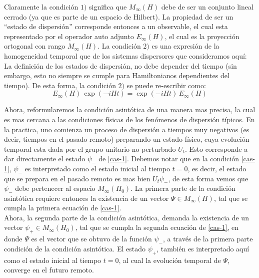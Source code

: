 \documentclass[12pt]{book}
\numberwithin{equation}{chapter}
\begin{document}
Claramente la condici\'on $1)$ significa que $M_{\infty}(H)$ debe de ser un conjunto lineal cerrado (ya que es parte de un espacio de Hilbert). La propiedad de ser un ``estado de dispersi\'on'' corresponde entonces a un observable, el cual esta representado por el operador auto adjunto $E_{\infty}(H)$, el cual es la proyecci\'on ortogonal con rango $M_{\infty}(H)$. La condici\'on $2)$ es una expresi\'on de la homogeneidad temporal que de los sistemas dispersores que consideramos aqu\'i: La definici\'on de los estados de dispersi\'on, no debe depender del tiempo (sin embargo, esto no siempre se cumple para Hamiltonianos dependientes del tiempo). De esta forma, la condici\'on $2)$ se puede re-escribir como:
\begin{equation}
E_{\infty}(H) \, \exp (-iHt) = \exp (-iHt) \, E_{\infty}(H)
\end{equation}

Ahora, reformularemos la condici\'on asint\'otica de una manera mas precisa, la cual es mas cercana a las condiciones f\'isicas de los fen\'omenos de dispersi\'on t\'ipicos. En la practica, uno comienza un proceso de dispersi\'on a tiempos muy negativos (es decir, tiempos en el pasado remoto) preparando un estado f\'isico, cuya evoluci\'on temporal esta dada por el grupo unitario no perturbado $U_{t}$. Esto corresponde a dar directamente el estado $\psi_{-}$ de \eqref{cas-1}. Debemos notar que en la condici\'on \eqref{cas-1}, $\psi_{-}$ es interpretado como el estado inicial al tiempo $t=0$, es decir, el estado que se prepara en el pasado remoto es mas bien $U_{t}\psi_{-}$, de esta forma vemos que $\psi_{-}$ debe pertenecer al espacio $M_{\infty} (H_{0})$. La primera parte de la condici\'on asint\'otica requiere entonces la existencia de un vector $\Psi \in M_{\infty} (H)$, tal que se cumpla la primera ecuaci\'on de \eqref{cas-1}.\\
Ahora, la segunda parte de la condici\'on asint\'otica, demanda la existencia de un vector $\psi_{+} \in M_{\infty}(H_{0})$, tal que se cumpla la segunda ecuaci\'on de \eqref{cas-1}, en donde $\Psi$ es el vector que se obtuvo de la funci\'on $\psi_{-}$, a trav\'es de la primera parte condici\'on de la condici\'on asint\'otica. El estado $\psi_{+}$, tambi\'en es interpretado aqu\'i como el estado inicial al tiempo $t=0$, al cual la evoluci\'on temporal de $\Psi$, converge en el futuro remoto.\\
\end{document}
